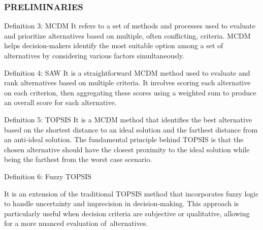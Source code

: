 \documentclass[serif, aspectratio=169]{beamer}
\newtheorem{thm co}{Theorem contd...}
\begin{document}
\begin{frame}
\frametitle<presentation>{PRELIMINARIES}
\begin{block} {Definition 3: MCDM}
\hspace{1em}It refers to a set of methods and processes used to evaluate and prioritize alternatives based on multiple, often conflicting, criteria. MCDM helps decision-makers identify the most suitable option among a set of alternatives by considering various factors simultaneously.
\end{block} 

\begin{block}{Definition 4: SAW}
\hspace{1em}It is a straightforward MCDM method used to evaluate and rank alternatives based on multiple criteria. It involves scoring each alternative on each criterion, then aggregating these scores using a weighted sum to produce an overall score for each alternative.
\end{block} 
\end{frame}
\begin{frame}
 \begin{block}{Definition 5: TOPSIS}      
\hspace{1em}It is a MCDM method that identifies the best alternative based on the shortest distance to an ideal solution and the farthest distance from an anti-ideal solution. The fundamental principle behind TOPSIS is that the chosen alternative should have the closest proximity to the ideal solution while being the farthest from the worst case scenario.
    \end{block}
   
\begin{block}{Definition 6: Fuzzy TOPSIS}

\hspace{1em}It is an extension of the traditional TOPSIS method that incorporates fuzzy logic to handle uncertainty and imprecision in decision-making. This approach is particularly useful when decision criteria are subjective or qualitative, allowing for a more nuanced evaluation of alternatives.
   \end{block} 
    
\end{frame}
\end{document}
